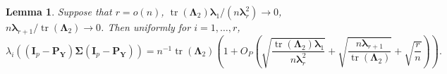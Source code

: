 \documentclass[10pt]{book}
\newtheorem{lemma}{Lemma}
\theoremstyle{definition}
\DeclareMathOperator{\mytr}{tr}
\newcommand{\bP}{\mathbf{P}}
\newcommand{\bY}{\mathbf{Y}}
\newcommand{\bI}{\mathbf{I}}
\newcommand{\bfsym}[1]{\ensuremath{\boldsymbol{#1}}}
\def\blambda {\bfsym {\lambda}}
\def\bLambda {\bfsym {\Lambda}}
\def\bSigma {\bfsym {\Sigma}}
\begin{document}
\begin{lemma}\label{gg:Lemma1}
    Suppose that
    $r=o(n)$, $\mytr(\bLambda_2)\blambda_1/(n\blambda_r^2)\to 0$,
    $n\blambda_{r+1}/\mytr(\bLambda_2)\to 0$.
    Then uniformly for $i=1,\ldots, r$,
\begin{equation*}
    \lambda_i\left(
             (\bI_p -\bP_\bY)\bSigma (\bI_p- \bP_{\bY})
         \right)
         =
             n^{-1}\mytr(\bLambda_2)
             \left(1
             +O_P\left(
                     \sqrt{\frac{\mytr(\bLambda_2)\blambda_1}{n\blambda_r^2}}  
                     +\sqrt{\frac{n\blambda_{r+1}}{\mytr(\bLambda_2)}}
                     +\sqrt{\frac{r}{n}}
             \right)
         \right)
             .
\end{equation*}

\end{lemma}
\end{document}

